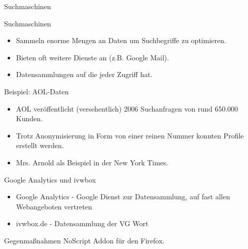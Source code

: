 \begin{frame}
Suchmaschinen
\end{frame}

\begin{frame}{Suchmaschinen}
	\begin{itemize}
		\item Sammeln enorme Mengen an Daten um Suchbegriffe zu optimieren.
		\item Bieten oft weitere Dienste an (z.B. Google Mail).
		\item Datensammlungen auf die jeder Zugriff hat.
	\end{itemize}
\end{frame}

\begin{frame}{Beispiel: AOL-Daten}
	\begin{itemize}
		\item AOL ver\"offentlicht (versehentlich) 2006 Suchanfragen von rund 650.000 Kunden.
		\item Trotz Anonymisierung in Form von einer reinen Nummer konnten Profile erstellt werden.
		\item Mrs. Arnold als Beispiel in der New York Times.%
	\end{itemize}
\end{frame}

\begin{frame}{Google Analytics und ivwbox}
	\begin{itemize}
		\item Google Analytics - Google Dienst zur Datensammlung, auf fast allen Webangeboten vertreten
		\item ivwbox.de - Datensammlung der VG Wort
	\end{itemize}
	\begin{block}{Gegenma\ss nahmen}
		NoScript Addon f\"ur den Firefox.
	\end{block}
\end{frame}

